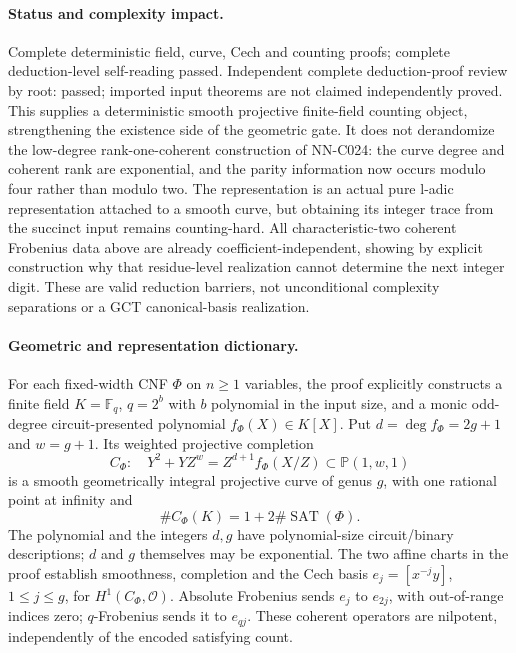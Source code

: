 \paragraph{Status and complexity impact.}
Complete deterministic field, curve, Cech and counting proofs; complete deduction-level self-reading passed. Independent complete deduction-proof review by root: passed; imported input theorems are not claimed independently proved. This supplies a deterministic smooth projective finite-field counting object, strengthening the existence side of the geometric gate. It does not derandomize the low-degree rank-one-coherent construction of NN-C024: the curve degree and coherent rank are exponential, and the parity information now occurs modulo four rather than modulo two. The representation is an actual pure l-adic representation attached to a smooth curve, but obtaining its integer trace from the succinct input remains counting-hard. All characteristic-two coherent Frobenius data above are already coefficient-independent, showing by explicit construction why that residue-level realization cannot determine the next integer digit. These are valid reduction barriers, not unconditional complexity separations or a GCT canonical-basis realization.

\paragraph{Geometric and representation dictionary.}
For each fixed-width CNF $\Phi$ on $n\geq1$ variables, the proof explicitly constructs a finite field $K=\mathbb F_q$, $q=2^b$ with $b$ polynomial in the input size, and a monic odd-degree circuit-presented polynomial $f_\Phi(X)\in K[X]$. Put $d=\deg f_\Phi=2g+1$ and $w=g+1$. Its weighted projective completion
\[
 C_\Phi:\quad Y^2+YZ^w=Z^{d+1}f_\Phi(X/Z)
       \subset\mathbb P(1,w,1)
\]
is a smooth geometrically integral projective curve of genus $g$, with one rational point at infinity and
\[
 \#C_\Phi(K)=1+2\#\operatorname{SAT}(\Phi).
\]
The polynomial and the integers $d,g$ have polynomial-size circuit/binary descriptions; $d$ and $g$ themselves may be exponential. The two affine charts in the proof establish smoothness, completion and the Cech basis $e_j=[x^{-j}y]$, $1\leq j\leq g$, for $H^1(C_\Phi,\mathcal O)$. Absolute Frobenius sends $e_j$ to $e_{2j}$, with out-of-range indices zero; $q$-Frobenius sends it to $e_{qj}$. These coherent operators are nilpotent, independently of the encoded satisfying count.


